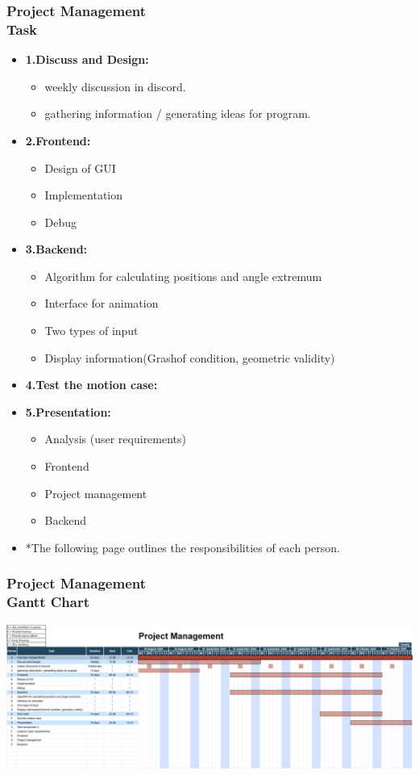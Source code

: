 \documentclass[ucs,10pt]{beamer}
\begin{document}
\begin{frame}
\frametitle{Project Management \\
	\small \color{rwth-blue} Task}
	\begin{itemize}
			\item \textbf{1.Discuss and Design:}
				\begin{itemize}
					\item weekly discussion in discord.
					\item gathering information / generating ideas for program.
				\end{itemize}
			\item \textbf{2.Frontend:}
				\begin{itemize}
					\item Design of GUI
					\item Implementation
					\item Debug
				\end{itemize}
			\item \textbf{3.Backend:}
				\begin{itemize}
				\item Algorithm for calculating positions and angle extremum
				\item Interface for animation
				\item Two types of input
				\item Display information(Grashof condition, geometric validity)
				\end{itemize}
			\item \textbf{4.Test the motion case:}
			\item \textbf{5.Presentation:}
				\begin{itemize}
				\item Analysis (user requirements)
				\item Frontend
				\item Project management
				\item Backend
				\end{itemize}
			\item *The following page outlines the responsibilities of each person.
	\end{itemize}
\end{frame}

\begin{frame}
\frametitle{Project Management \\
	\small \color{rwth-blue} Gantt Chart}

	\begin{center}
		\includegraphics[width=\textwidth]{./Figures/project management 10-18.png}
	\end{center}
\end{frame}
\end{document}
